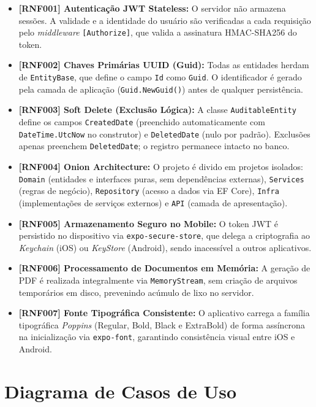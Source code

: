 \begin{itemize}
    \item \textbf{[RNF001] Autenticação JWT Stateless:} O servidor não armazena sessões. A validade e a identidade do usuário são verificadas a cada requisição pelo \textit{middleware} \texttt{[Authorize]}, que valida a assinatura HMAC-SHA256 do token.
    \item \textbf{[RNF002] Chaves Primárias UUID (Guid):} Todas as entidades herdam de \texttt{EntityBase}, que define o campo \texttt{Id} como \texttt{Guid}. O identificador é gerado pela camada de aplicação (\texttt{Guid.NewGuid()}) antes de qualquer persistência.
    \item \textbf{[RNF003] Soft Delete (Exclusão Lógica):} A classe \texttt{AuditableEntity} define os campos \texttt{CreatedDate} (preenchido automaticamente com \texttt{DateTime.UtcNow} no construtor) e \texttt{DeletedDate} (nulo por padrão). Exclusões apenas preenchem \texttt{DeletedDate}; o registro permanece intacto no banco.
    \item \textbf{[RNF004] Onion Architecture:} O projeto é divido em projetos isolados: \texttt{Domain} (entidades e interfaces puras, sem dependências externas), \texttt{Services} (regras de negócio), \texttt{Repository} (acesso a dados via EF Core), \texttt{Infra} (implementações de serviços externos) e \texttt{API} (camada de apresentação).
    \item \textbf{[RNF005] Armazenamento Seguro no Mobile:} O token JWT é persistido no dispositivo via \texttt{expo-secure-store}, que delega a criptografia ao \textit{Keychain} (iOS) ou \textit{KeyStore} (Android), sendo inacessível a outros aplicativos.
    \item \textbf{[RNF006] Processamento de Documentos em Memória:} A geração de PDF é realizada integralmente via \texttt{MemoryStream}, sem criação de arquivos temporários em disco, prevenindo acúmulo de lixo no servidor.
    \item \textbf{[RNF007] Fonte Tipográfica Consistente:} O aplicativo carrega a família tipográfica \textit{Poppins} (Regular, Bold, Black e ExtraBold) de forma assíncrona na inicialização via \texttt{expo-font}, garantindo consistência visual entre iOS e Android.
\end{itemize}

\section{Diagrama de Casos de Uso}

